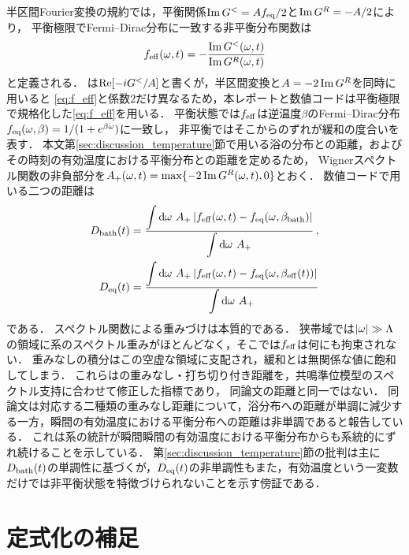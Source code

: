 \documentclass[a4paper,11pt,onecolumn,baselineskip=14.5pt]{jlreq}
\begin{document}
半区間Fourier変換の規約では，平衡関係$\Im G^{<}= Af_{\mathrm{eq}}/2$と$\Im G^{R}=-A/2$により，
平衡極限でFermi--Dirac分布に一致する非平衡分布関数は
\begin{equation}
  f_{\mathrm{eff}}(\omega,t)
  = -\frac{\Im G^{<}(\omega,t)}{\Im G^{R}(\omega,t)}
  \label{eq:f_eff}
\end{equation}
と定義される．
\cite{Wang2024}は$\Re[-iG^{<}/A]$と書くが，半区間変換と$A=-2\Im G^{R}$を同時に用いると
\eqref{eq:f_eff}と係数$2$だけ異なるため，本レポートと数値コードは平衡極限で規格化した\eqref{eq:f_eff}を用いる．
平衡状態では$f_{\mathrm{eff}}$は逆温度$\beta$のFermi--Dirac分布$f_{\mathrm{eq}}(\omega,\beta)=1/(1+e^{\beta\omega})$に一致し，
非平衡ではそこからのずれが緩和の度合いを表す．
本文第\ref{sec:discussion_temperature}節で用いる浴の分布との距離，および
その時刻の有効温度における平衡分布との距離を定めるため，
Wignerスペクトル関数の非負部分を$A_+(\omega,t)=\max\{-2\Im G^{R}(\omega,t),0\}$とおく．
数値コードで用いる二つの距離は
\begin{equation}
  \begin{split}
    D_{\mathrm{bath}}(t)
    &= \frac{\displaystyle\int \dd{\omega}\,A_+\,
             \abs{f_{\mathrm{eff}}(\omega,t) - f_{\mathrm{eq}}(\omega,\beta_{\mathrm{bath}})}}
            {\displaystyle\int \dd{\omega}\,A_+}\,, \\
    D_{\mathrm{eq}}(t)
    &= \frac{\displaystyle\int \dd{\omega}\,A_+\,
             \abs{f_{\mathrm{eff}}(\omega,t) - f_{\mathrm{eq}}(\omega,\beta_{\mathrm{eff}}(t))}}
            {\displaystyle\int \dd{\omega}\,A_+}
  \end{split}
  \label{eq:distance_bath}
\end{equation}
である．
スペクトル関数による重みづけは本質的である．
狭帯域では$\abs{\omega}\gg\Lambda$の領域に系のスペクトル重みがほとんどなく，そこでは$f_{\mathrm{eff}}$は何にも拘束されない．
重みなしの積分はこの空虚な領域に支配され，緩和とは無関係な値に飽和してしまう．
これらは\cite{Wang2024}の重みなし・打ち切り付き距離を，共鳴準位模型のスペクトル支持に合わせて修正した指標であり，
同論文の距離と同一ではない．
同論文は対応する二種類の重みなし距離について，浴分布への距離が単調に減少する一方，瞬間の有効温度における平衡分布への距離は非単調であると報告している．
これは系の統計が瞬間瞬間の有効温度における平衡分布からも系統的にずれ続けることを示している．
第\ref{sec:discussion_temperature}節の批判は主に$D_{\mathrm{bath}}(t)$の単調性に基づくが，$D_{\mathrm{eq}}(t)$の非単調性もまた，有効温度という一変数だけでは非平衡状態を特徴づけられないことを示す傍証である．

\section{定式化の補足}
\label{sec:appendix_supp}
\end{document}
